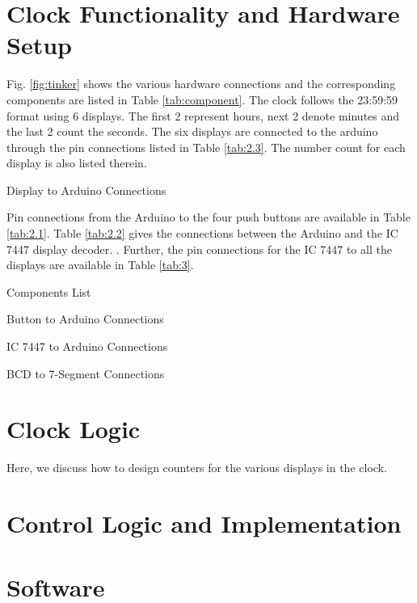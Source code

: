 \documentclass[conference]{IEEEtran}
\begin{document}
%
%
\section{Clock Functionality and Hardware Setup}
Fig. \ref{fig:tinker}  shows the various hardware connections and the corresponding components are listed in 
Table \ref{tab:component}.  The clock follows the 23:59:59 format using 6 displays.  The first 2 represent hours, next 2 denote minutes and the last 2 count the seconds.  
The six displays are connected to the arduino through the pin connections listed in Table \ref{tab:2.3}.  The number count for each display is also listed therein.
\begin{table}[!h]
\centering

\caption{Display to Arduino Connections}
\label{tab:2.3}
\end{table}
Pin connections from the Arduino to the four push buttons are available in 
Table \ref{tab:2.1}. Table \ref{tab:2.2} gives the connections between the Arduino and the IC 7447 display decoder.  .  Further, the pin connections for the IC 7447 to all the displays are available in Table \ref{tab:3}.



\begin{table}[!h]
\centering

\caption{Components List}
\label{tab:component}
\end{table}
\begin{table}[!h]
\centering

\caption{Button to Arduino Connections}
\label{tab:2.1}
\end{table}
\begin{table}[!h]
\centering

\caption{IC 7447 to Arduino Connections}
\label{tab:2.2}
\end{table}
\begin{table}[!h]
\centering

\caption{BCD to 7-Segment Connections}
\label{tab:3}
\end{table}
\section{Clock Logic}
Here, we discuss how to design counters for the various displays in the clock.

\section{Control Logic and Implementation}




\section{Software}

%



\end{document}
